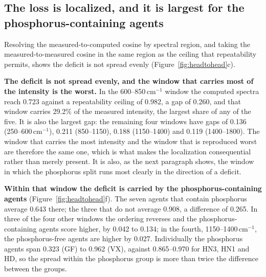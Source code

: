 \documentclass[review,12pt]{elsarticle}
\newcommand*\wn{\ensuremath{\text{cm}^{-1}}}
\begin{document}
\subsection{The loss is localized, and it is largest for the phosphorus-containing agents}
\label{sec:windows}

Resolving the measured-to-computed cosine by spectral region, and taking the
measured-to-measured cosine in the same region as the ceiling that repeatability
permits, shows the deficit is not spread evenly (Figure~\ref{fig:headtohead}c).

\textbf{The deficit is not spread evenly, and the window that carries most of the
intensity is the worst.} In the 600--850\,\wn{} window the computed spectra
reach 0.723 against a repeatability ceiling of 0.982, a gap of 0.260, and that window
carries 29.2\% of the measured intensity, the largest share of any of the five. It is
also the largest gap: the remaining four windows have gaps of 0.136 (250--600\,\wn{}),
0.211 (850--1150), 0.188 (1150--1400) and 0.119 (1400--1800). The window that carries the
most intensity and the window that is reproduced worst are therefore the same one, which
is what makes the localization consequential rather than merely present. It is also, as
the next paragraph shows, the window in which the phosphorus split runs most clearly in
the direction of a deficit.

\textbf{Within that window the deficit is carried by the phosphorus-containing agents}
(Figure~\ref{fig:headtohead}f). The seven agents that contain phosphorus average
0.643 there; the three that do not average 0.908, a difference of 0.265. In three of the
four other windows the ordering reverses and the phosphorus-containing agents score
higher, by 0.042 to 0.134; in the fourth, 1150--1400\,\wn{}, the phosphorus-free agents
are higher by 0.027. Individually the phosphorus agents span 0.323 (GF) to
0.962 (VX), against 0.865--0.970 for HN3, HN1 and HD, so the spread within the
phosphorus group is more than twice the difference between the groups.
\end{document}
